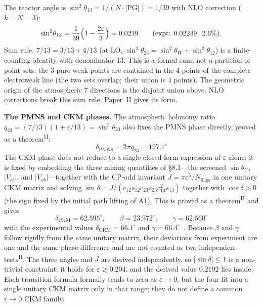 \documentclass[12pt,a4paper]{article}
\newcommand{\PII}{\textsuperscript{\textup{II}}}
\begin{document}
The reactor angle is
$\sin^2\!\theta_{13} = 1/(N \cdot |\mathrm{PG}|) = 1/39$
with NLO correction ($k = N = 3$):
\begin{equation}
  \sin^2\!\theta_{13} = \frac{1}{39}\Bigl(1 - \frac{2\varepsilon}{3}\Bigr) = 0.0219
  \qquad (\text{expt: } 0.02249,\; 2.6\%).
\end{equation}
Sum rule:
$7/13 = 3/13 + 4/13$
(at LO, $\sin^2\!\theta_{23} = \sin^2\!\theta_W + \sin^2\!\theta_{12}$)
is a finite-counting identity with denominator 13.
This is a formal sum, not a partition of point sets:
the 3 pure-weak points are contained in the 4 points of the complete
electroweak line (the two sets overlap; their union is 4 points).
The geometric origin of the atmospheric 7 directions is the disjoint
union above. NLO corrections break this sum rule; Paper~II gives its form.

\noindent\textbf{The PMNS and CKM phases.}\;
The atmospheric holonomy ratio $q_{23} = (7/13)(1+\varepsilon/13) = \sin^2\!\theta_{23}$ also fixes the PMNS phase directly, proved as a theorem\PII{}:
\begin{equation}
\delta_\mathrm{PMNS} = 2\pi q_{23} = 197.1^\circ
\end{equation}
The CKM phase does not reduce to a single closed-form expression of $\varepsilon$ alone: it is fixed by embedding the three mixing quantities of \S8.1---the screened $\sin\theta_C$, $|V_{cb}|$, and $|V_{ub}|$---together with the CP-odd invariant $J = \pi\varepsilon^5/N_\mathrm{flags}$ in one unitary CKM matrix and solving $\sin\delta = J/(c_{12}s_{12}c_{23}s_{23}c_{13}^2 s_{13})$ together with $\cos\delta > 0$ (the sign fixed by the initial path lifting of A1). This is proved as a theorem\PII{} and gives
\begin{equation}
\delta_\mathrm{CKM} = 62.595^\circ,\qquad \beta = 23.972^\circ,\qquad \gamma = 62.560^\circ
\end{equation}
with the experimental values $\delta_\mathrm{CKM} = 66.1^\circ$ and $\gamma = 66.4^\circ$~\cite{pdg}. Because $\beta$ and $\gamma$ follow rigidly from the same unitary matrix, their deviations from experiment are one and the same phase difference and are not counted as two independent tests\PII{}. The three angles and $J$ are derived independently, so $|\sin\delta| \le 1$ is a non-trivial constraint; it holds for $\varepsilon \gtrsim 0.204$, and the derived value $0.2192$ lies inside. Each transition formula formally tends to zero as $\varepsilon \to 0$, but the four fit into a single unitary CKM matrix only in that range; they do not define a common $\varepsilon \to 0$ CKM family.
\end{document}

